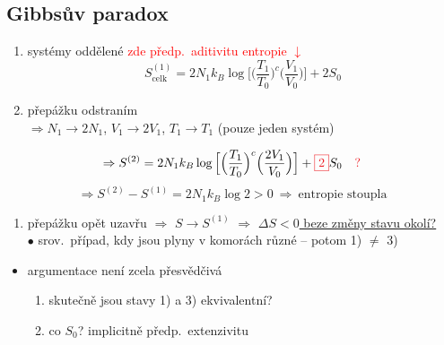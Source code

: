 \subsection*{Gibbsův paradox}
\begin{minipage}{0.42\textwidth}
\end{minipage}
\begin{minipage}{0.56\textwidth}
\begin{enumerate}[label=\arabic*)]
  \item systémy oddělené \hfill \textcolor{Red}{\small zde předp.\ aditivitu entropie $\downarrow$}
  \[ S^{(1)}_{\text{celk}} = 2N_1k_B\log\Big[\Big(\frac{T_1}{T_0}\Big)^c\Big(\frac{V_1}{V_0}\Big)\Big] + 2S_0 \]
  \item přepážku odstraním \\
  $\Rightarrow N_1\to 2N_1$, $V_1\to 2V_1$, $T_1\to T_1$ \quad (pouze jeden systém)
\end{enumerate}
\end{minipage}

\[
  \Rightarrow S^{(2)} = 2N_1k_B\log\Big[\Big(\frac{T_1}{T_0}\Big)^c\Big(\frac{2V_1}{V_0}\Big)\Big] + \textcolor{Red}{\boxed{2}}S_0 \quad \textcolor{Red}{?}
\]
\[
  \Rightarrow S^{(2)} - S^{(1)} = 2N_1k_B\log 2 > 0 \ \Rightarrow\ \text{entropie stoupla}
\]
\begin{enumerate}[label=\arabic*),start=3]
  \item přepážku opět uzavřu $\Rightarrow$ $S\to S^{(1)}$ $\Rightarrow$ \underline{$\Delta S < 0$ beze změny stavu okolí?} \\
  $\bullet$ srov.\ případ, kdy jsou plyny v komorách různé -- potom 1) $\neq$ 3)
\end{enumerate}
\begin{itemize}
  \item argumentace není zcela přesvědčivá
  \begin{enumerate}[label=\alph*)]
    \item skutečně jsou stavy 1) a 3) ekvivalentní?
    \item co $S_0$? implicitně předp.\ extenzivitu \pozor{!}
  \end{enumerate}
\end{itemize}

